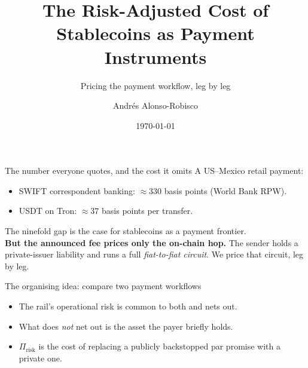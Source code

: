 \documentclass[11pt,aspectratio=169]{beamer}
\title{The Risk-Adjusted Cost of Stablecoins as Payment Instruments}
\subtitle{Pricing the payment workflow, leg by leg}
\author{Andr\'es Alonso-Robisco}
\institute{IE University \,\textbar\, Banco de Espa\~na}
\date{\today}
\newcommand{\El}{\ensuremath{\Pi_{\text{risk}}}}
\begin{document}
\begin{frame}\titlepage\end{frame}

\begin{frame}{The number everyone quotes, and the cost it omits}
A US--Mexico retail payment:
\begin{itemize}
  \item SWIFT correspondent banking: \(\approx 330\) basis points (World Bank RPW).
  \item USDT on Tron: \(\approx 37\) basis points per transfer.
\end{itemize}
\vspace{1em}
The ninefold gap is the case for stablecoins as a payment frontier. \\[0.6em]
\textbf{But the announced fee prices only the on-chain hop.} The sender holds a
private-issuer liability and runs a full \emph{fiat-to-fiat circuit}. We price
that circuit, leg by leg.
\end{frame}

\begin{frame}{The organising idea: compare two payment workflows}
\centering
{}
\vspace{1em}
\begin{itemize}
  \item The rail's operational risk is common to both and nets out.
  \item What does \emph{not} net out is the asset the payer briefly holds.
  \item \(\El\) is the cost of replacing a publicly backstopped par promise with a private one.
\end{itemize}
\end{frame}
\end{document}
